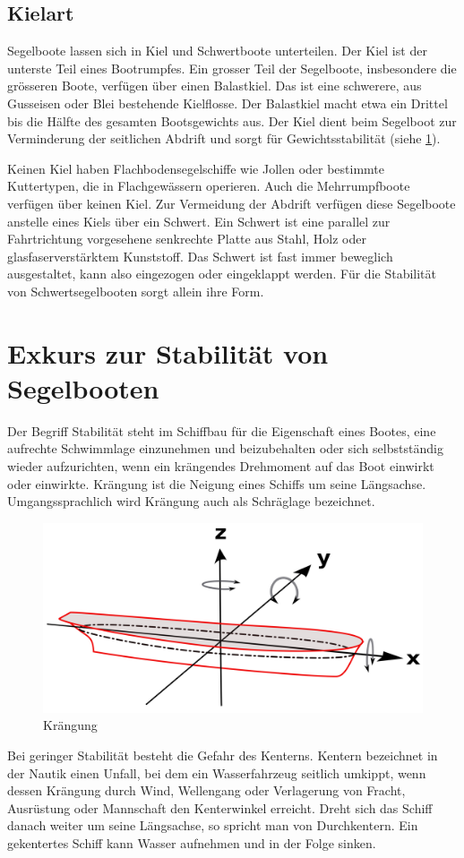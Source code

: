\subsection{Kielart}
Segelboote lassen sich in Kiel und Schwertboote unterteilen. Der Kiel ist der unterste Teil eines Bootrumpfes. Ein grosser Teil der Segelboote, insbesondere die grösseren Boote, verfügen über einen Balastkiel. Das ist eine schwerere, aus Gusseisen oder Blei bestehende Kielflosse. Der Balastkiel macht etwa ein Drittel bis die Hälfte des gesamten Bootsgewichts aus. Der Kiel dient beim Segelboot zur Verminderung der seitlichen Abdrift und sorgt für Gewichtsstabilität (siehe \ref{subchap:exkurs}).

Keinen Kiel haben Flachbodensegelschiffe wie Jollen oder bestimmte Kuttertypen, die in Flachgewässern operieren. Auch die Mehrrumpfboote verfügen über keinen Kiel. Zur Vermeidung der Abdrift verfügen diese Segelboote anstelle eines Kiels über ein Schwert. Ein Schwert ist eine parallel zur Fahrtrichtung vorgesehene senkrechte Platte aus Stahl, Holz oder glasfaserverstärktem Kunststoff. Das Schwert ist fast immer beweglich ausgestaltet, kann also eingezogen oder eingeklappt werden. Für die Stabilität von Schwertsegelbooten sorgt allein ihre Form.
\section{Exkurs zur Stabilität von Segelbooten}
\label{subchap:exkurs}
Der Begriff Stabilität steht im Schiffbau für die Eigenschaft eines Bootes, eine aufrechte Schwimmlage einzunehmen und beizubehalten oder sich selbstständig wieder aufzurichten, wenn ein krängendes Drehmoment auf das Boot einwirkt oder einwirkte. Krängung ist die Neigung eines Schiffs um seine Längsachse. \cite{noauthor_stabilitat_2023}  Umgangssprachlich wird Krängung auch als Schräglage bezeichnet.
\begin{figure}[H]
    \centering
    \includegraphics[width=0.75\linewidth]{assets/Achsen_Schiffsbewegung.svg.png}
    \caption{Krängung}
    \label{fig:enter-label}
\end{figure}
Bei geringer Stabilität besteht die Gefahr des Kenterns. Kentern bezeichnet in der Nautik einen Unfall, bei dem ein Wasserfahrzeug seitlich umkippt, wenn dessen Krängung durch Wind, Wellengang oder Verlagerung von Fracht, Ausrüstung oder Mannschaft den Kenterwinkel erreicht. Dreht sich das Schiff danach weiter um seine Längsachse, so spricht man von Durchkentern. Ein gekentertes Schiff kann Wasser aufnehmen und in der Folge sinken.  

